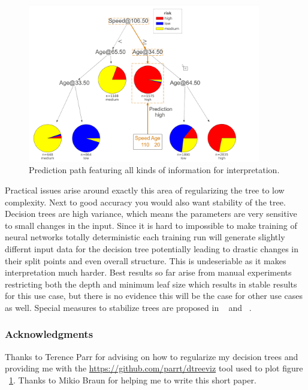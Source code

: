 \documentclass{article} %
\begin{document}
\begin{figure}[h]
\begin{center}
\includegraphics[width=4.0in]{dtreeviz-prediction-path.png}
\end{center}
\caption{Prediction path featuring all kinds of information for interpretation.}
\label{fig:prediction-path}
\end{figure}

Practical issues arise around exactly this area of regularizing the tree to low complexity. Next to good accuracy you would also want stability of the tree. Decision trees are high variance, which means the parameters are very sensitive to small changes in the input. Since it is hard to impossible to make training of neural networks totally deterministic each training run will generate slightly differnt input data for the decision tree potentially leading to drastic changes in their split points and even overall structure. This is undeseriable as it makes interpretation much harder. Best results so far arise from manual experiments restricting both the depth and minimum leaf size which results in stable results for this use case, but there is no evidence this will be the case for other use cases as well. Special measures to stabilize trees are proposed in ~\citep{arsov2019stability} and ~\citep{last2002stability}. 

\subsubsection*{Acknowledgments}
Thanks to Terence Parr for advising on how to regularize my decision trees and providing me with the \url{https://github.com/parrt/dtreeviz} tool used to plot figure ~\ref{fig:prediction-path}. Thanks to Mikio Braun for helping me to write this short paper.



\end{document}
